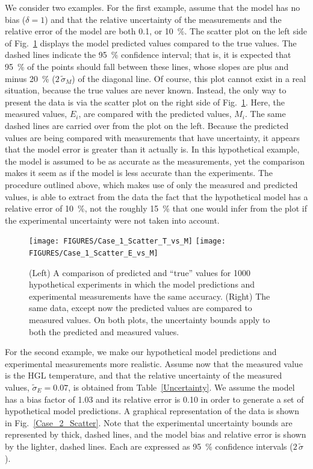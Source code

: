 We consider two examples. For the first example, assume that the model has no bias ($\delta=1$) and that the relative uncertainty of the measurements and the
relative error of the model are both 0.1, or 10~\%. The scatter plot on the left side of Fig.~\ref{Case_1_Scatter} displays the model predicted values compared to the
true values. The dashed lines indicate the 95~\% confidence interval; that is, it is expected that 95~\% of the points should fall between these
lines, whose slopes are plus and minus 20~\% ($2\, \widetilde{\sigma}_M$) of the diagonal line. Of course, this plot cannot exist in a real situation, because the true
values are never known. Instead, the only way to present the data is via the scatter plot on the right side of Fig.~\ref{Case_1_Scatter}. Here, the measured values, $E_i$, are
compared with the predicted values, $M_i$. The same dashed lines are carried over from the plot on the left. Because the predicted values are being compared
with measurements that have uncertainty, it appears that the model error is greater than it actually is. In this hypothetical example, the model is
assumed to be as accurate as the measurements, yet the comparison makes it seem as if the model is less accurate than the experiments. The procedure outlined
above, which makes use of only the measured and predicted values, is able to extract from the data the fact that the hypothetical model has a
relative error of 10~\%, not the roughly 15~\% that one would infer from the plot if the experimental uncertainty were not taken into account.

\begin{figure}[t]
\begin{center}
\texttt{[image: FIGURES/Case\_1\_Scatter\_T\_vs\_M]}
\texttt{[image: FIGURES/Case\_1\_Scatter\_E\_vs\_M]}
\end{center}
\caption[Verification of the model error calculation, Case 1.]{(Left) A comparison of predicted and ``true'' values for 1000 hypothetical
experiments in which the model predictions and experimental measurements have the same accuracy.
(Right) The same data, except now the predicted values are compared to measured values. On both plots, the uncertainty bounds apply to both
the predicted and measured values.}
\label{Case_1_Scatter}
\end{figure}


For the second example, we make our hypothetical model predictions and experimental measurements more realistic. Assume now that the
measured value is the HGL temperature, and that the relative uncertainty of the measured values, $\widetilde{\sigma}_E=0.07$, is obtained from Table~\ref{Uncertainty}.
We assume the model has a bias factor of 1.03 and its relative error is 0.10 in order to generate a set of hypothetical model predictions.
A graphical representation of the data is shown in Fig.~\ref{Case_2_Scatter}. Note that the
experimental uncertainty bounds are represented by thick, dashed lines, and the model bias and relative error is shown by the lighter, dashed lines.
Each are expressed as 95~\% confidence intervals ($2 \, \widetilde{\sigma}$).

